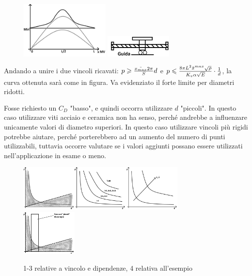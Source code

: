 \begin{figure}[h]
    \centering
    \includegraphics[width=0.4\textwidth]{Immagini/vel_critica_vite_2sol.png}
    \includegraphics[width=0.3\textwidth]{Immagini/vite_guida_MV.png}
\end{figure}

Andando a unire i due vincoli ricavati: \(p \geqslant \frac{\Ddot{x_{max}} 2\pi }{S} d\) e \( p \leqslant \frac{8\pi L^2 \Ddot{x}^{max} \sqrt{\rho}}{K_v \alpha \sqrt{E}} \cdot \frac{1}{d} \), la curva ottenuta sarà come in figura. Va evidenziato il forte limite per diametri ridotti.

Fosse richiesto un \( C_D \) "basso", e quindi occorra utilizzare \(d\) "piccoli". In questo caso utilizzare viti acciaio e ceramica non ha senso, perché andrebbe a influenzare unicamente valori di diametro superiori. In questo caso utilizzare vincoli più rigidi potrebbe aiutare, perché porterebbero ad un aumento del numero di punti utilizzabili, tuttavia occorre valutare se i valori aggiunti possano essere utilizzati nell'applicazione in esame o meno.

\begin{figure}[h]
    \centering
    \includegraphics[width=0.75\textwidth]{Immagini/viti_ricir_vincoli_p_d.png}
    \includegraphics[width=0.25\textwidth]{Immagini/viti_ricir_esempio_vincoli.png}
    \caption{1-3 relative a vincolo e dipendenze, 4 relativa all'esempio}
\end{figure}
